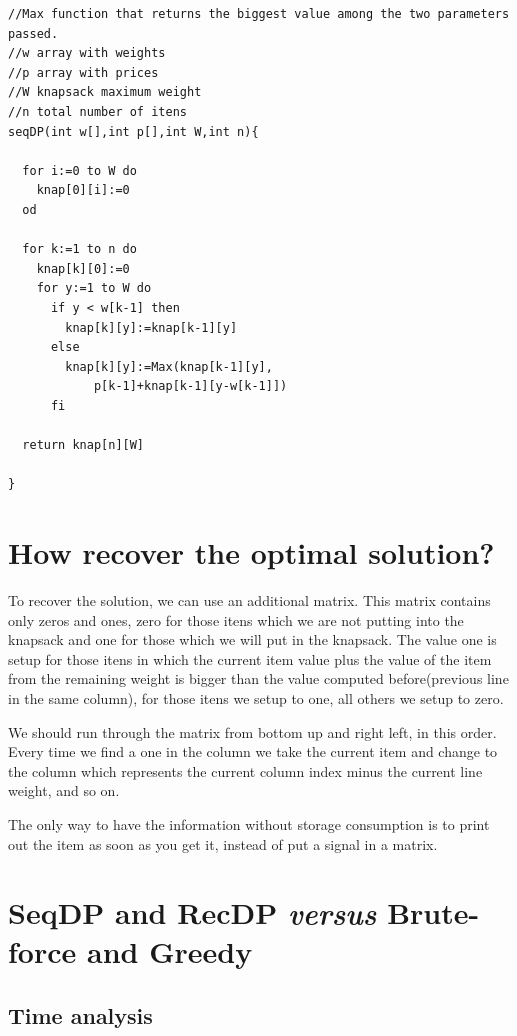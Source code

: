\documentclass{article}
\begin{document}
\begin{lstlisting}
//Max function that returns the biggest value among the two parameters passed.
//w array with weights
//p array with prices
//W knapsack maximum weight
//n total number of itens
seqDP(int w[],int p[],int W,int n){

  for i:=0 to W do
    knap[0][i]:=0
  od

  for k:=1 to n do
    knap[k][0]:=0
    for y:=1 to W do
      if y < w[k-1] then
        knap[k][y]:=knap[k-1][y]
      else
        knap[k][y]:=Max(knap[k-1][y],
			p[k-1]+knap[k-1][y-w[k-1]])
      fi

  return knap[n][W]

}
\end{lstlisting}


\section{How recover the optimal solution?}          

To recover the solution, we can use an additional matrix. This matrix contains only zeros and ones, zero for those itens which we are not
putting into the knapsack and one for those which we will put in the knapsack. The value one is setup for those itens in which the current 
item value plus the value of the item from the remaining weight is bigger than the value computed before(previous line in the same column), 
for those itens we setup to one, all others we setup to zero.

We should run through the matrix from bottom up and right left, in this order. Every time we find a one in the column we take the current 
item and change to the column which represents the current column index minus the current line weight, and so on.

The only way to have the information without storage consumption is to print out the item as soon as you get it, instead of put a signal in a matrix.

\section{SeqDP and RecDP \textit{versus} Brute-force and Greedy}

\subsection{Time analysis}
\end{document}
